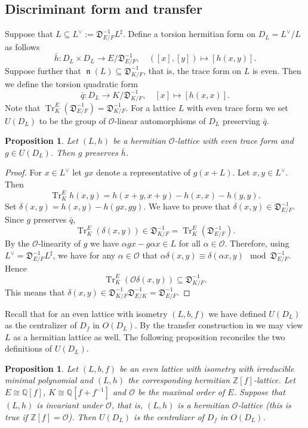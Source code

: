 \documentclass[a4paper]{amsart}
\theoremstyle{definition}
\theoremstyle{plain}
\newtheorem{proposition}[definition]{Proposition}
\DeclareMathOperator{\Tr}{Tr}
\DeclareMathOperator{\norm}{\mathfrak{n}}
\newcommand{\QQ}{\mathbb{Q}}
\newcommand{\ZZ}{\mathbb{Z}}
\renewcommand{\O}{\mathcal{O}}
\newcommand{\FD}{\mathfrak{D}}
\begin{document}
\subsection{Discriminant form and transfer}
Suppose that $L \subseteq L^\vee := {\FD_{E/F}^{-1}} L^\sharp$. Define a torsion hermitian form on $D_L=L^\vee/L$ as follows
\[\bar h\colon D_L \times D_L \to E/{\FD_{E/F}^{-1}}, \quad ([x],[y]) \mapsto [h(x,y)].\]
Suppose further that $\norm(L) \subseteq {\FD_{K/F}^{-1}}$, that is, the trace form on $L$ is even. Then we define the
torsion quadratic form
\[\bar q\colon D_L \to K{/}{\FD_{K/F}^{-1}},\quad [x] \mapsto [h(x,x)].\]
Note that $\Tr^E_K({\FD_{E/F}^{-1}})={\FD_{K/F}^{-1}}$.
For a lattice $L$ with even trace form we set $U(D_L)$ to be the group of $\O$-linear automorphisms of $D_L$ preserving $\bar q$.

\begin{proposition}
Let $(L,h)$ be a hermitian $\O$-lattice with even trace form and
 $g \in U(D_L)$. Then $g$ preserves $\bar h$.
\end{proposition}

\begin{proof}
 For $x \in L^\vee$ let $gx$ denote a representative of $g(x+L)$.
  Let $x,y \in L^\vee$. Then
  \[\Tr^E_K h(x,y) = h(x+y,x+y) - h(x,x) - h(y,y).\]
 Set $\delta(x,y) = h(x,y) - h(gx,gy)$. We have to prove that $\delta(x,y) \in {\FD_{E/F}^{-1}}$.
  Since $g$ preserves $\bar q$,
  \[\Tr^E_K( \delta(x,y)) \in {\FD_{K/F}^{-1}} =\Tr^E_K({\FD_{E/F}^{-1}}). \]
 By the $\O$-linearity of $g$ we have $\alpha gx - g\alpha x \in L$ for all $\alpha \in \O$.
  Therefore, using $L^\vee = {\FD_{E/F}^{-1}}L^\sharp$, we have for any $\alpha \in \O$ that $\alpha \delta(x,y) \equiv \delta(\alpha x,y) \mod {\FD_{E/F}^{-1}}$. Hence
  \[\Tr^E_K(\O \delta(x,y)) \subseteq {\FD_{K/F}^{-1}}.\]
  This means that $\delta(x,y) \in {\FD_{K/F}^{-1}}{\FD_{E/K}^{-1}}={\FD_{E/F}^{-1}}$.
\end{proof}

Recall that for an even lattice with isometry $(L,b,f)$ we have defined $U(D_L)$ as the centralizer of $D_f$ in $O(D_L)$. By the transfer construction in  we may view $L$ as a hermitian lattice as well.
%
%
The following proposition reconciles the two definitions of $U(D_L)$.

\begin{proposition}\label{UDLtransfer}
  Let $(L,b,f)$ be an even lattice with isometry with irreducible minimal polynomial and $(L,h)$ the corresponding hermitian $\ZZ[f]$-lattice.
  Let $E \cong \QQ[f]$, $K\cong \QQ[f+f^{-1}]$ and $\O$ be the maximal order of $E$. Suppose that $(L,h)$ is invariant under $\O$, that is, $(L, h)$ is a hermitian $\O$-lattice (this is true if $\ZZ[f] = \O$).
 Then $U(D_L)$ is the centralizer of $D_f$ in $O(D_L)$.
\end{proposition}
\end{document}
